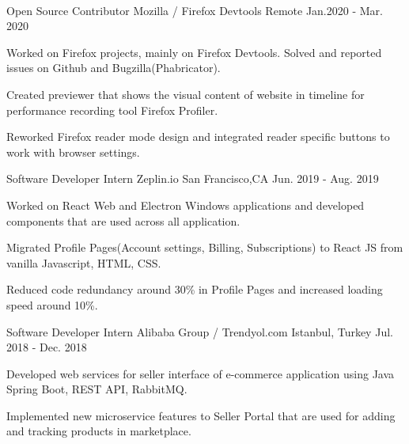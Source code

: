 \begin{cventries}
\\
  \cvopenentry
   {Open Source Contributor} %
    {Mozilla / Firefox Devtools} %
    {Remote} %
    {Jan.2020 - Mar. 2020} %
    {
      \begin{cvitems} %
        \item {Worked on Firefox projects, mainly on Firefox Devtools. Solved and reported issues on Github and Bugzilla(Phabricator).}
        \item {Created previewer that shows the visual content of website in timeline for performance recording tool Firefox Profiler.
        \item {Reworked Firefox reader mode design and integrated reader specific buttons to work with browser settings.}
}
      \end{cvitems}
    }
  \cvopenentry
   {Software Developer Intern} %
    {Zeplin.io} %
    {San Francisco,CA} %
    {Jun. 2019 - Aug. 2019} %
    {
      \begin{cvitems} %
        \item {Worked on React Web and Electron Windows applications and developed components that are used across all application.}
		\item {Migrated Profile Pages(Account settings, Billing, Subscriptions) to React JS from vanilla Javascript, HTML, CSS.}
        \item {Reduced code redundancy around 30\% in Profile Pages and increased loading speed around 10\%. }
      \end{cvitems}
    }
  \cvopenentry
   {Software Developer Intern} %
    {Alibaba Group / Trendyol.com} %
    {Istanbul, Turkey} %
    {Jul. 2018 - Dec. 2018} %
    {
      \begin{cvitems} %
		 \item {Developed web services for seller interface of e-commerce application using Java Spring Boot, REST API, RabbitMQ.}
        \item {Implemented new microservice features to Seller Portal that are used for adding and tracking products in marketplace.}
      \end{cvitems}
    }



\end{cventries}
